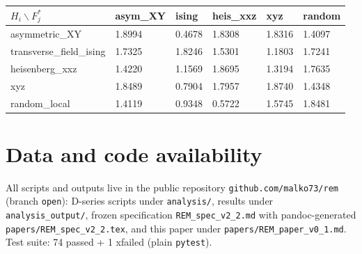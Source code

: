 \documentclass[
]{article}
\begin{document}
{\def\LTcaptype{none} %
\begin{longtable}[]{@{}llllll@{}}
\toprule\noalign{}
\(H_i \backslash F^*_j\) & asym\_XY & ising & heis\_xxz & xyz &
random \\
\midrule\noalign{}
\endhead
\bottomrule\noalign{}
\endlastfoot
asymmetric\_XY & 1.8994 & 0.4678 & 1.8308 & 1.8316 & 1.4097 \\
transverse\_field\_ising & 1.7325 & 1.8246 & 1.5301 & 1.1803 & 1.7241 \\
heisenberg\_xxz & 1.4220 & 1.1569 & 1.8695 & 1.3194 & 1.7635 \\
xyz & 1.8489 & 0.7904 & 1.7957 & 1.8740 & 1.4348 \\
random\_local & 1.4119 & 0.9348 & 0.5722 & 1.5745 & 1.8481 \\
\end{longtable}
}

\section{Data and code availability}\label{data-and-code-availability}

All scripts and outputs live in the public repository
\texttt{github.com/malko73/rem} (branch \texttt{open}): D-series scripts
under \texttt{analysis/}, results under \texttt{analysis\_output/},
frozen specification \texttt{REM\_spec\_v2\_2.md} with pandoc-generated
\texttt{papers/REM\_spec\_v2\_2.tex}, and this paper under
\texttt{papers/REM\_paper\_v0\_1.md}. Test suite: 74 passed + 1 xfailed
(plain \texttt{pytest}).
\end{document}
